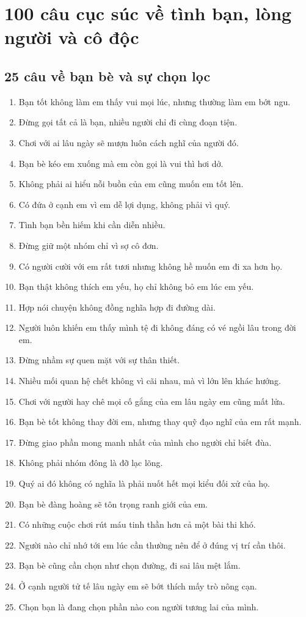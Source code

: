 \chapter{100 câu cục súc về tình bạn, lòng người và cô độc}

\section{25 câu về bạn bè và sự chọn lọc}
\begin{enumerate}[leftmargin=*]
\item Bạn tốt không làm em thấy vui mọi lúc, nhưng thường làm em bớt ngu.
\item Đừng gọi tất cả là bạn, nhiều người chỉ đi cùng đoạn tiện.
\item Chơi với ai lâu ngày sẽ mượn luôn cách nghĩ của người đó.
\item Bạn bè kéo em xuống mà em còn gọi là vui thì hơi dở.
\item Không phải ai hiểu nỗi buồn của em cũng muốn em tốt lên.
\item Có đứa ở cạnh em vì em dễ lợi dụng, không phải vì quý.
\item Tình bạn bền hiếm khi cần diễn nhiều.
\item Đừng giữ một nhóm chỉ vì sợ cô đơn.
\item Có người cười với em rất tươi nhưng không hề muốn em đi xa hơn họ.
\item Bạn thật không thích em yếu, họ chỉ không bỏ em lúc em yếu.
\item Hợp nói chuyện không đồng nghĩa hợp đi đường dài.
\item Người luôn khiến em thấy mình tệ đi không đáng có vé ngồi lâu trong đời em.
\item Đừng nhầm sự quen mặt với sự thân thiết.
\item Nhiều mối quan hệ chết không vì cãi nhau, mà vì lớn lên khác hướng.
\item Chơi với người hay chê mọi cố gắng của em lâu ngày em cũng mất lửa.
\item Bạn bè tốt không thay đời em, nhưng thay quỹ đạo nghĩ của em rất mạnh.
\item Đừng giao phần mong manh nhất của mình cho người chỉ biết đùa.
\item Không phải nhóm đông là đỡ lạc lõng.
\item Quý ai đó không có nghĩa là phải nuốt hết mọi kiểu đối xử của họ.
\item Bạn bè đàng hoàng sẽ tôn trọng ranh giới của em.
\item Có những cuộc chơi rút máu tinh thần hơn cả một bài thi khó.
\item Người nào chỉ nhớ tới em lúc cần thường nên để ở đúng vị trí cần thôi.
\item Bạn bè cũng cần chọn như chọn đường, đi sai lâu mệt lắm.
\item Ở cạnh người tử tế lâu ngày em sẽ bớt thích mấy trò nông cạn.
\item Chọn bạn là đang chọn phần nào con người tương lai của mình.
\end{enumerate}

